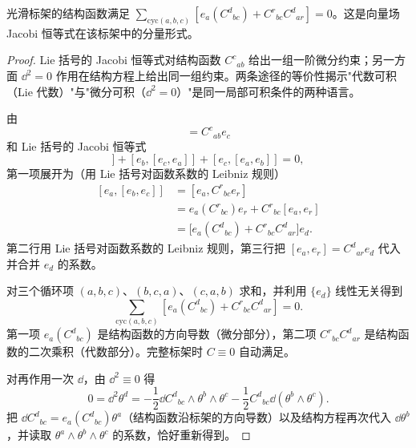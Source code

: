 \begin{proposition}
光滑标架的结构函数满足 $\sum_{\mathrm{cyc}(a,b,c)}[e_a(C^d{}_{bc})+C^r{}_{bc}C^d{}_{ar}]=0$。这是向量场 Jacobi 恒等式在该标架中的分量形式。
\end{proposition}
\begin{proof}
Lie 括号的 Jacobi 恒等式对结构函数 $C^c{}_{ab}$ 给出一组一阶微分约束；另一方面 $\dd^2=0$ 作用在结构方程上给出同一组约束。两条途径的等价性揭示"代数可积（Lie 代数）"与"微分可积（$\dd^2=0$）"是同一局部可积条件的两种语言。

由
\begin{equation*}
 [e_a,e_b]=C^c{}_{ab}e_c
\end{equation*}
和 Lie 括号的 Jacobi 恒等式
\begin{equation*}
 [e_a,[e_b,e_c]]+[e_b,[e_c,e_a]]+[e_c,[e_a,e_b]]=0,
\end{equation*}
第一项展开为（用 Lie 括号对函数系数的 Leibniz 规则）
\begin{equation*}
\begin{aligned}
 [e_a,[e_b,e_c]]
 &=[e_a,C^r{}_{bc}e_r]\\
 &=e_a(C^r{}_{bc})e_r+C^r{}_{bc}[e_a,e_r]\\
 &=\bigl[e_a(C^d{}_{bc})+C^r{}_{bc}C^d{}_{ar}\bigr]e_d.
\end{aligned}
\end{equation*}
第二行用 Lie 括号对函数系数的 Leibniz 规则，第三行把 $[e_a,e_r]=C^d{}_{ar}e_d$ 代入并合并 $e_d$ 的系数。

对三个循环项 $(a,b,c)$、$(b,c,a)$、$(c,a,b)$ 求和，并利用 $\{e_d\}$ 线性无关得到
\begin{equation}\label{eq:math-dg-anholonomy-jacobi}
{
\sum_{\mathrm{cyc}(a,b,c)}
\left[
 e_a(C^d{}_{bc})+C^r{}_{bc}C^d{}_{ar}
\right]=0.}
\end{equation}
第一项 $e_a(C^d{}_{bc})$ 是结构函数的方向导数（微分部分），第二项 $C^r{}_{bc}C^d{}_{ar}$ 是结构函数的二次乘积（代数部分）。完整标架时 $C\equiv0$ 自动满足。

对再作用一次 $\dd$，由 $\dd^2\equiv0$ 得
\begin{equation*}
 0=\dd^2\theta^d
 =-\frac12\dd C^d{}_{bc}\wedge\theta^b\wedge\theta^c
 -\frac12C^d{}_{bc}\dd(\theta^b\wedge\theta^c).
\end{equation*}
把 $\dd C^d{}_{bc}=e_a(C^d{}_{bc})\theta^a$（结构函数沿标架的方向导数）以及结构方程再次代入 $\dd\theta^b$，并读取 $\theta^a\wedge\theta^b\wedge\theta^c$ 的系数，恰好重新得到。


\end{proof}

